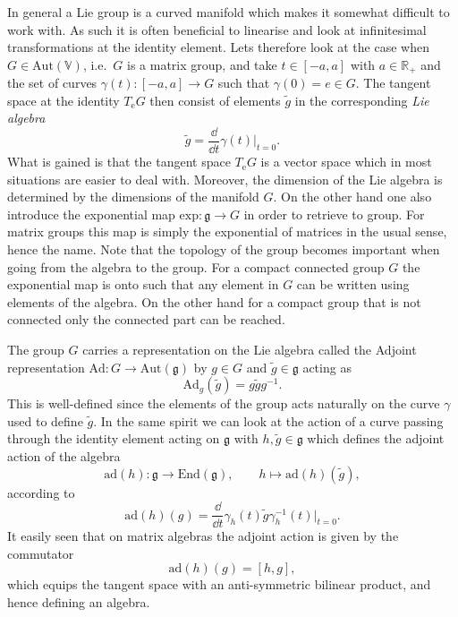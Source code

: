 In general a Lie group is a curved manifold which makes it somewhat difficult to work with. As such it is often beneficial to linearise and look at infinitesimal transformations at the identity element. Lets therefore look at the case when $G\in \text{Aut}(\mathbb{V})$, i.e.\ $G$ is a matrix group, and take $t\in [-a,a]$ with $a\in\mathbb{R_+}$ and the set of curves $\gamma(t): [-a,a]\to G$ such that $\gamma(0)= e\in G$. The tangent space at the identity $T_\mathrm{e}G$ then consist of elements $\tilde{g}$ in the corresponding \emph{Lie algebra}
\begin{equation}
\tilde{g} = \frac{\dd}{\dd t}\gamma(t)|_{t=0}.
\end{equation}
What is gained is that the tangent space $T_\mathrm{e}G$ is a vector space which in most situations are easier to deal with. Moreover, the dimension of the Lie algebra is determined by the dimensions of the manifold $G$. On the other hand one also introduce the exponential map $\text{exp}: \mathfrak{g}\to G$ in order to retrieve to group. For matrix groups this map is simply the exponential of matrices in the usual sense, hence the name. Note that the topology of the group becomes important when going from the algebra to the group. For a compact connected group $G$ the exponential map is onto such that any element in $G$ can be written using elements of the algebra. On the other hand for a compact group that is not connected only the connected part can be reached. 

The group $G$ carries a representation on the Lie algebra called the Adjoint representation $\text{Ad}: G\to \text{Aut}(\mathfrak{g})$ by $g\in G$ and $\tilde{g}\in\mathfrak{g}$ acting as
\begin{equation}\label{eq:Liegrouprep}
    \text{Ad}_g(\tilde{g}) = g\tilde{g}g^{-1}.
\end{equation}
This is well-defined since the elements of the group acts naturally on the curve $\gamma$ used to define $\tilde{g}$. In the same spirit we can look at the action of a curve passing through the identity element acting on $\mathfrak{g}$ with $h,\tilde{g}\in \mathfrak{g}$ which defines the adjoint action of the algebra 
\begin{equation}
    \text{ad}(h): \mathfrak{g}\to \text{End}(\mathfrak{g}),\qquad h\mapsto \text{ad}(h)(\tilde{g}),
\end{equation}
according to 
\begin{equation}
    \text{ad}(h)(g) = \frac{\dd}{\dd t}\gamma_h(t)\tilde{g}\gamma_h^{-1}(t)|_{t=0}.
\end{equation}
It easily seen that on matrix algebras the adjoint action is given by the commutator 
\begin{equation}
    \text{ad}(h)(g) = [h,g],
\end{equation}
which equips the tangent space with an anti-symmetric bilinear product, and hence defining an algebra. 

